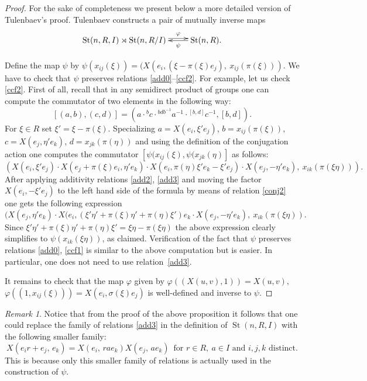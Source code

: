 \documentclass[11pt]{amsart}
\theoremstyle{plain} \declaretheorem[name=Theorem, Refname={Theorem,Theorems}]{tm} \Crefname{tm}{Theorem}{Theorems}
\numberwithin{equation}{section}
\theoremstyle{definition} \newtheorem{df}[lm]{Definition} \Crefname{df}{Definition}{Definitions}
\theoremstyle{remark} \newtheorem{rk}[lm]{Remark} \Crefname{rk}{Remark}{Remarks}
\newcommand{\St}{\mathop{\mathrm{St}}\nolimits}
\begin{document}
\begin{proof} For the sake of completeness we present below a more detailed version of Tulenbaev's proof.
Tulenbaev constructs a pair of mutually inverse maps
$$\xymatrix{ \St(n, R, I) \rtimes \St(n, R/I) \ar@<0.6ex>[r]^-\varphi &  \ar[l]^-\psi \St(n, R).}$$

Define the map $\psi$ by $\psi(x_{ij}(\xi)) = (X(e_i, (\xi - \pi(\xi)e_j),\ x_{ij}(\pi(\xi)))$. 
We have to check that $\psi$ preserves relations \eqref{add0}--\eqref{ccf2}.
For example, let us check \eqref{ccf2}. 
First of all, recall that in any semidirect product of groups one can compute the commutator of two elements in the following way:
$$[(a, b), (c, d)] = (a \cdot {}^bc \cdot {}^{bdb^{-1}}a^{-1} \cdot {}^{[b, d]}c^{-1} , [b, d]).$$
For $\xi\in R$ set $\xi' = \xi - \pi(\xi)$.
Specializing $a = X(e_i, \xi' e_j)$, $b = x_{ij}(\pi(\xi))$, $c = X(e_j, \eta'e_k)$, $d = x_{jk}(\pi(\eta))$ and using the definition of the conjugation action 
one computes the commutator $[\psi(x_{ij}(\xi), \psi(x_{jk}(\eta)]$ as follows:
$$\left(X(e_i, \xi' e_j) \cdot X(e_j + \pi(\xi)e_i, \eta'e_k) \cdot X(e_i, \pi(\eta)\xi' e_k - \xi' e_j) \cdot X(e_j, -\eta'e_k),\ x_{ik}(\pi(\xi\eta))\right).$$
After applying additivity relations \eqref{add2}, \eqref{add3} and moving the factor $X(e_i, -\xi' e_j)$ to the left hand side of the formula by means of relation \eqref{conj2}
one gets the following expression
$$(X(e_j, \eta'e_k) \cdot X(e_i, (\xi' \eta' + \pi(\xi)\eta' + \pi(\eta)\xi')e_k \cdot X(e_j, -\eta'e_k),\ x_{ik}(\pi(\xi\eta)).$$
Since $\xi'\eta' + \pi(\xi)\eta' + \pi(\eta)\xi' = \xi\eta - \pi(\xi\eta)$ the above expression clearly simplifies to $\psi(x_{ik}(\xi\eta))$, as claimed.
Verification of the fact that $\psi$ preserves relations \eqref{add0}, \eqref{ccf1} is similar to the above computation but is easier.
In particular, one does not need to use relation~\eqref{add3}.

It remains to check that the map $\varphi$ given by $\varphi\left((X(u, v), 1)\right) = X(u, v),$ $\varphi\left((1, x_{ij}(\xi))\right) = X(e_i, \sigma(\xi)e_j)$
is well-defined and inverse to $\psi$.
\end{proof}

\begin{rk} \label{rk:T123'} Notice that from the proof of the above proposition it follows that one could replace the family of relations \eqref{add3}
in the definition of $\St(n, R, I)$ with the following smaller family:
\setcounter{equation}{2} \renewcommand{\theequation}{T\arabic{equation}'}
\begin{equation} X(e_ir+e_j,\,e_k)=X(e_i,\,rae_k)X(e_j,\,ae_k)\,\text{ for }r\in R,\ a\in I\text{ and } i,j,k\text{ distinct}. \label{add3'} \end{equation} 
This is because only this smaller family of relations is actually used in the construction of $\psi$. \end{rk}
\end{document}
